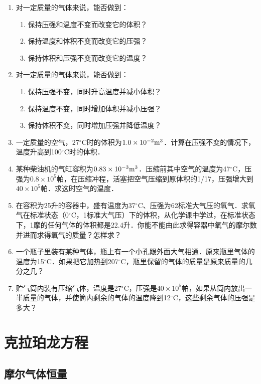 \begin{enumerate}
    \item 对一定质量的气体来说，能否做到：
    \begin{enumerate}
    \item    保持压强和温度不变而改变它的体积？
    \item    保持温度和体积不变而改变它的压强？
    \item    保持体积和压强不变而改变它的温度？     
    \end{enumerate}
\item  对一定质量的气体来说，能否做到：
\begin{enumerate}
\item 保持压强不变，同时升高温度并减小体积？
\item 保持温度不变，同时增加体积并减小压强？
\item 保持体积不变，同时增加压强并降低温度？
\end{enumerate}

\item  一定质量的空气，27$^\circ$C时的体积为$1.0\times 10^{-2}{\rm m}^3$．计算在压强不变的情况下，温度升高到100$^\circ$C时的体积．
\item  某种柴油机的气缸容积为$0.83\times 10^{-3}{\rm m^3}$．压缩前其中空气的温度为47$^\circ$C，压强为$0.8\times 10^5$帕，在压缩冲程，活塞把空气压缩到原体积的1/17，压强增大到$40\times 10^5$帕．求这时空气的温度．
\item  在容积为25升的容器中，盛有温度为37$^\circ$C、压强为62标准大气压的氧气．求氧气在标准状态（0$^\circ$C，1标准大气压）下的体积，从化学课中学过，在标准状态下，1摩的任何气体的体积都是22.4升．你能不能由此求得容器中氧气的摩尔数并进而求得氧气的质量？怎样求？
\item  一个瓶子里装有某种气体，瓶上有一个小孔跟外面大气相通．原来瓶里气体的温度为15$^\circ$C．如果把它加热到207$^\circ$C，瓶里保留的气体的质量是原来质量的几分之几？
\item  贮气筒内装有压缩气体，温度是27$^\circ$C，压强是$40\times 10^5$帕，如果从筒内放出一半质量的气体，并使筒内剩余的气体的温度降到12$^\circ$C，这些剩余气体的压强是多大？

\end{enumerate}


\section{克拉珀龙方程}
\subsection{摩尔气体恒量} 

